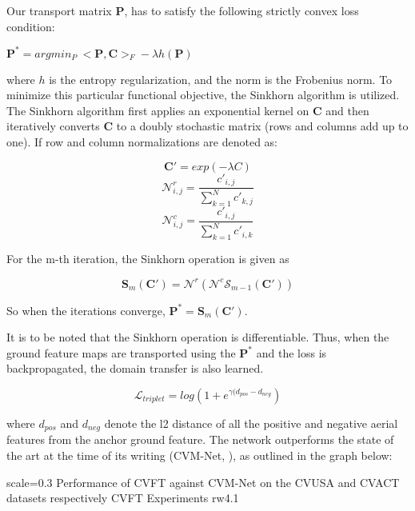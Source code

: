 Our transport matrix $\mathbf{P}$, has to satisfy the following strictly convex loss condition:

$\mathbf{P}^* = argmin_{P} \ <\mathbf{P}, \mathbf{C}>_F - \lambda h(\mathbf{P})
$

where $h$ is the entropy regularization, and the norm is the Frobenius norm. To minimize this particular functional objective, the Sinkhorn algorithm is utilized. The Sinkhorn algorithm first applies an exponential kernel on $\mathbf{C}$ and then iteratively converts $\mathbf{C}$ to a doubly stochastic matrix (rows and columns add up to one). If row and column normalizations are denoted as:

\[\mathbf{C}' = exp(-\lambda C)\]
\[\mathcal{N}^r_{i, j} = \frac{c'_{i,j}}{\sum_{k=1}^{N} c'_{k,j}} \]
\[\mathcal{N}^c_{i, j} = \frac{c'_{i,j}}{\sum_{k=1}^{N}c'_{i,k}} \]

For the m-th iteration, the Sinkhorn operation is given as 

\[\mathbf{S}_m(\mathbf{C}') = \mathcal{N}^r(\mathcal{N}^c \mathcal{S}_{m-1}(\mathbf{C}'))\]

So when the iterations converge, $\mathbf{P}^* = \mathbf{S}_m(\mathbf{C}')$.

It is to be noted that the Sinkhorn operation is differentiable. Thus, when the ground feature maps are transported using the $\mathbf{P}^*$ and the loss is backpropagated, the domain transfer is also learned.

\[\mathcal{L}_{triplet} = log(1 + e^{\gamma (d_{pos} - d_{neg}})\]

where $d_{pos}$ and $d_{neg}$ denote the l2 distance of all the positive and negative aerial features from the anchor ground feature. The network outperforms the state of the art at the time of its writing (CVM-Net, \cite{Hu2018}), as outlined in the graph below:


{scale=0.3}%
{Performance of CVFT against CVM-Net on the CVUSA and CVACT datasets respectively}%
{CVFT Experiments}%
{rw4.1} %







